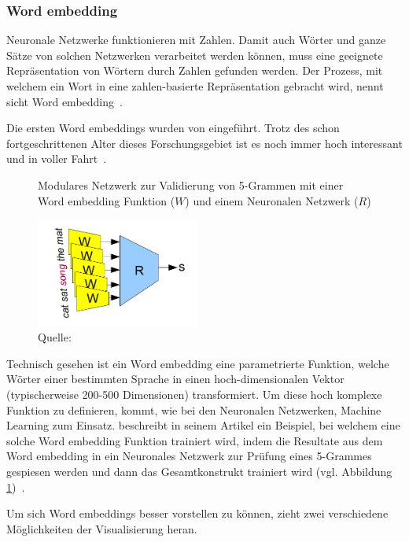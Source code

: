 \subsubsection{Word embedding}

Neuronale Netzwerke funktionieren mit Zahlen. Damit auch Wörter und ganze Sätze von solchen Netzwerken verarbeitet werden können, muss eine geeignete Repräsentation von Wörtern durch Zahlen gefunden werden. Der Prozess, mit welchem ein Wort in eine zahlen-basierte Repräsentation gebracht wird, nennt sicht Word embedding~\autocite{Olah2014b}.

Die ersten Word embeddings wurden von \textcite{Bengio2001} eingeführt. Trotz des schon fortgeschrittenen Alter dieses Forschungsgebiet ist es noch immer hoch interessant und in voller Fahrt~\autocite{Olah2014b}.

\begin{figure} 
    \caption{Modulares Netzwerk zur Validierung von 5-Grammen mit einer Word embedding Funktion ($W$) und einem Neuronalen Netzwerk ($R$)}
    \label{wordembeddingtraining}
    \centering
    \includegraphics[width=0.48\textwidth]{graphics/wordembeddingtraining.png}
    \caption*{Quelle: \textcite{Olah2014b}}
\end{figure}
Technisch gesehen ist ein Word embedding eine parametrierte Funktion, welche Wörter einer bestimmten Sprache in einen hoch-dimensionalen Vektor (typischerweise 200-500 Dimensionen) transformiert. Um diese hoch komplexe Funktion zu definieren, kommt, wie bei den Neuronalen Netzwerken, Machine Learning zum Einsatz. \textcite{Olah2014b} beschreibt in seinem Artikel ein Beispiel, bei welchem eine solche Word embedding Funktion trainiert wird, indem die Resultate aus dem Word embedding in ein Neuronales Netzwerk zur Prüfung eines 5-Grammes gespiesen werden und dann das Gesamtkonstrukt trainiert wird (vgl. Abbildung \ref{wordembeddingtraining})~\autocite{Olah2014b}.

Um sich Word embeddings besser vorstellen zu können, zieht \textcite{Olah2014b} zwei verschiedene Möglichkeiten der Visualisierung heran.

